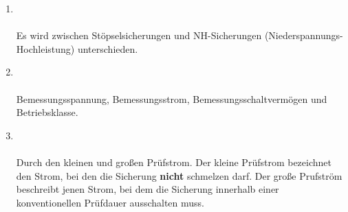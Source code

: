 \begin{enumerate}
    \item   {} \\\\
            Es wird zwischen Stöpselsicherungen und NH-Sicherungen (Niederspannungs-Hochleistung) unterschieden.

    \item   {} \\\\
            Bemessungsspannung, Bemessungsstrom, Bemessungsschaltvermögen und Betriebsklasse.

    \item   {} \\\\
            Durch den kleinen und großen Prüfstrom. Der kleine Prüfstrom bezeichnet den Strom, bei den die Sicherung \textbf{nicht} schmelzen darf.
            Der große Prufström beschreibt jenen Strom, bei dem die Sicherung innerhalb einer konventionellen Prüfdauer ausschalten muss.


\end{enumerate}
